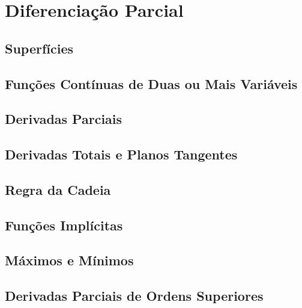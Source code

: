 \chapter{Diferenciação Parcial}
\label{chp:partialdiff}

\section{Superfícies}
\label{sec:surfaces}

\section{Funções Contínuas de Duas ou Mais Variáveis}
\label{sec:func2ormore}

\section{Derivadas Parciais}
\label{sec:partialdiff}

\section{Derivadas Totais e Planos Tangentes}
\label{sec:totaldiff}

\section{Regra da Cadeia}
\label{sec:chainrulepartial}

\section{Funções Implícitas}
\label{sec:partialimplicitfunc}

\section{Máximos e Mínimos}
\label{sec:maximaminima}

\section{Derivadas Parciais de Ordens Superiores}
\label{sec:higherpartialdiff}

\begin{chapterproblems}
\end{chapterproblems}


